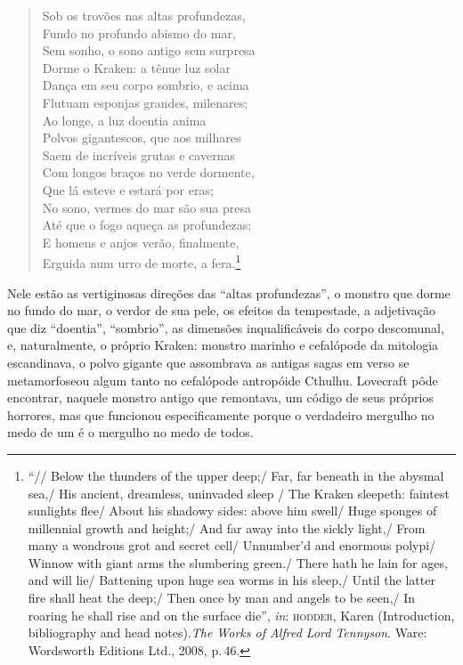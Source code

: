 \begin{quote}\noindent
Sob os trovões nas altas profundezas,\\
Fundo no profundo abismo do mar,\\
Sem sonho, o sono antigo sem surpresa\\
Dorme o Kraken: a tênue luz solar\\
Dança em seu corpo sombrio, e acima\\
Flutuam esponjas grandes, milenares;\\
Ao longe, a luz doentia anima\\
Polvos gigantescos, que aos milhares\\
Saem de incríveis grutas e cavernas\\
Com longos braços no verde dormente,\\
Que lá esteve e estará por eras;\\
No sono, vermes do mar são sua presa\\
Até que o fogo aqueça as profundezas;\\
E homens e anjos verão, finalmente,\\
Erguida num urro de morte, a fera.\footnote{``// Below the
  thunders of the upper deep;/ Far, far beneath in the abysmal sea,/ His
  ancient, dreamless, uninvaded sleep / The Kraken sleepeth: faintest
  sunlights flee/ About his shadowy sides: above him swell/ Huge sponges
  of millennial growth and height;/ And far away into the sickly
  light,/ From many a wondrous grot and secret cell/ Unnumber'd and
  enormous polypi/ Winnow with giant arms the slumbering green./ There
  hath he lain for ages, and will lie/ Battening upon huge sea worms in
  his sleep,/ Until the latter fire shall heat the deep;/ Then once by man
  and angels to be seen,/ In roaring he shall rise and on the surface
  die'', \emph{in}: \textsc{hodder}, Karen (Introduction, bibliography and head
  notes).\emph{The Works of Alfred Lord Tennyson}. Ware: Wordsworth
  Editions Ltd., 2008, p.\,46.}
\end{quote}

Nele estão as vertiginosas direções das ``altas profundezas'', o monstro
que dorme no fundo do mar, o verdor de sua pele, os efeitos da
tempestade, a adjetivação que diz ``doentia'', ``sombrio'', as dimensões
inqualificáveis do corpo descomunal, e, naturalmente, o próprio Kraken:
monstro marinho e cefalópode da mitologia escandinava, o polvo gigante
que assombrava as antigas sagas em verso se metamorfoseou algum tanto no
cefalópode antropóide Cthulhu. Lovecraft pôde encontrar, naquele monstro
antigo que remontava, um código de seus próprios horrores, mas que
funcionou especificamente porque o verdadeiro mergulho no medo de um é o
mergulho no medo de todos.


